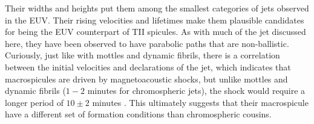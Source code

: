 \documentclass[12pt]{ociamthesis}
\newcommand{\kms}{~\rm{km ~s^{-1}}}
\begin{document}
%
Their widths and heights put them among the smallest categories of jets observed in the EUV. Their rising velocities and lifetimes make them plausible candidates for being the EUV counterpart of TII spicules. As with much of the jet discussed here, they have been observed to have parabolic paths that are non-ballistic. Curiously, just like with mottles and dynamic fibrils, there is a correlation between the initial velocities and declarations of the jet, which indicates that macrospicules are driven by magnetoacoustic shocks, but unlike mottles and dynamic fibrils ($1-2$ minutes for chromospheric jets), the shock would require a longer period of $10\pm 2$ minutes \cite{Loboda2019ApJ871230L}. This ultimately suggests that their macrospicule have a different set of formation conditions than chromospheric cousins.
\end{document}
